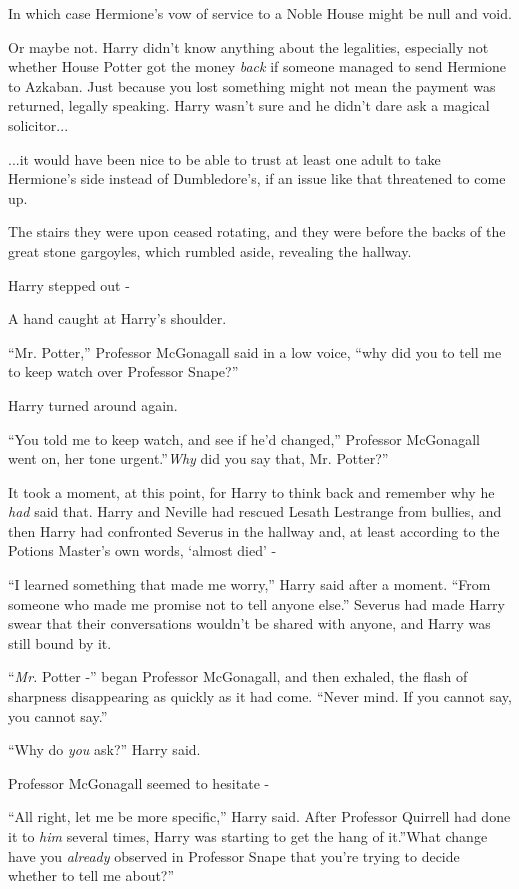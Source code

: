 In which case Hermione's vow of service to a Noble House might be null
and void.

Or maybe not. Harry didn't know anything about the legalities,
especially not whether House Potter got the money \emph{back} if someone
managed to send Hermione to Azkaban. Just because you lost something
might not mean the payment was returned, legally speaking. Harry wasn't
sure and he didn't dare ask a magical solicitor...

...it would have been nice to be able to trust at least one adult
to take Hermione's side instead of Dumbledore's, if an issue like that
threatened to come up.

The stairs they were upon ceased rotating, and they were before the
backs of the great stone gargoyles, which rumbled aside, revealing the
hallway.

Harry stepped out -

A hand caught at Harry's shoulder.

``Mr. Potter,'' Professor McGonagall said in a low voice, ``why did you
to tell me to keep watch over Professor Snape?''

Harry turned around again.

``You told me to keep watch, and see if he'd changed,'' Professor
McGonagall went on, her tone urgent.''\emph{Why} did you say that, Mr.
Potter?''

It took a moment, at this point, for Harry to think back and remember
why he \emph{had} said that. Harry and Neville had rescued Lesath
Lestrange from bullies, and then Harry had confronted Severus in the
hallway and, at least according to the Potions Master's own words,
`almost died' -

``I learned something that made me worry,'' Harry said after a moment.
``From someone who made me promise not to tell anyone else.'' Severus
had made Harry swear that their conversations wouldn't be shared with
anyone, and Harry was still bound by it.

``\emph{Mr.} Potter -'' began Professor McGonagall, and then exhaled, the
flash of sharpness disappearing as quickly as it had come. ``Never mind.
If you cannot say, you cannot say.''

``Why do \emph{you} ask?'' Harry said.

Professor McGonagall seemed to hesitate -

``All right, let me be more specific,'' Harry said. After Professor
Quirrell had done it to \emph{him} several times, Harry was starting to
get the hang of it.''What change have you \emph{already} observed in
Professor Snape that you're trying to decide whether to tell me about?''

